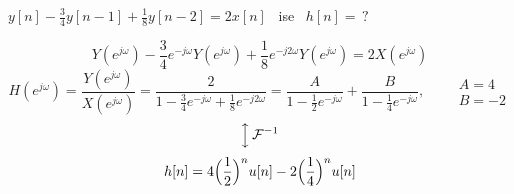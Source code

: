 \documentclass[11pt,a4paper]{article}
\begin{document}
\begin{ornek}[]
  $y[n]-\frac34y[n-1]+\frac18y[n-2]=2x[n]$ \ ise \ $h[n]=\,?$
\end{ornek}
\[
  Y(e^{j\omega})-\frac34e^{-j\omega}Y(e^{j\omega})+\frac18e^{-j2\omega}Y(e^{j\omega})=2X(e^{j\omega})
\]
\[
  H(e^{j\omega})=\frac{Y(e^{j\omega})}{X(e^{j\omega})}=\frac{2}{1-\frac34e^{-j\omega}+\frac18e^{-j2\omega}}
  =\frac{A}{1-\frac12e^{-j\omega}}+\frac{B}{1-\frac14e^{-j\omega}},\qquad
  \begin{array}{l}A=4\\ B=-2\end{array}
\]
\[ \Big\updownarrow\,\mathcal{F}^{-1} \]
\[
  h[n]=4\Bigl(\frac12\Bigr)^nu[n]-2\Bigl(\frac14\Bigr)^nu[n]
\]
\end{document}
